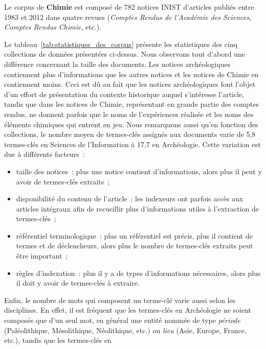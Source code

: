   Le corpus de \textbf{Chimie} est composé de 782 notices INIST d'articles
  publiés entre 1983 et 2012 dans quatre revues (\textit{Comptes Rendus de
  l'Académie des Sciences}, \textit{Comptes Rendus Chimie}, etc.).

  Le tableau~\ref{tab:statistiques_des_corpus} présente les statistiques des
  cinq collections de données présentées ci-dessus. Nous observons tout d'abord
  une différence concernant la taille des documents. Les notices archéologiques
  contiennent plus d'informations que les autres notices et les notices de
  Chimie en contiennent moins. Ceci est dû au fait que les notices
  archéologiques font l'objet d'un effort de présentation du contexte historique
  auquel s'intéresse l'article, tandis que dans les notices de Chimie,
  représentant en grande partie des comptes rendus, ne donnent parfois que le
  noms de l'expériences réalisée et les noms des éléments chimiques qui entrent
  en jeu. Nous remarquons aussi qu'en fonction des collections, le nombre moyen
  de termes-clés assignés aux documents varie de 5,8 termes-clés en Sciences de
  l'Information à 17,7 en Archéologie. Cette variation est due à différents
  facteurs~:
  \begin{itemize}
    \item{taille des notices~: plus une notice contient d'informations, alors
          plus il peut y avoir de termes-clés extraits~;}
    \item{disponibilité du contenu de l'article~: les indexeurs ont parfois
          accès aux articles intégraux afin de recueillir plus d'informations
          utiles à l'extraction de termes-clés~;}
    \item{référentiel terminologique~: plus un référentiel est précis, plus il
          contient de termes et de déclencheurs, alors plus le nombre de
          termes-clés extraits peut être important~;}
    \item{règles d'indexation~: plus il y a de types d'informations nécessaires,
          alors plus il doit y avoir de termes-clés à extraire.}
  \end{itemize}
  Enfin, le nombre de mots qui composent un terme-clé varie aussi selon les
  disciplines. En effet, il est fréquent que les termes-clés en Archéologie ne
  soient composés que d'un seul mot, en général une entité nommée de type
  \textit{période} (\og{}Paléolithique\fg{}, \og{}Mésolithique\fg{},
  \og{}Néolithique\fg{}, etc.) ou \textit{lieu} (\og{}Asie\fg{},
  \og{}Europe\fg{}, \og{}France\fg{}, etc.), tandis que les termes-clés en
